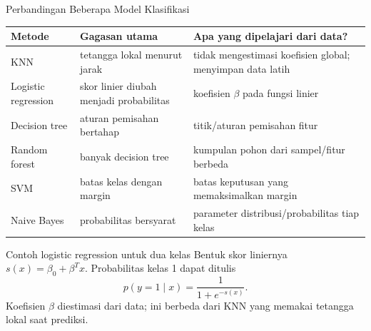 \documentclass[aspectratio=169,11pt]{beamer}
\begin{document}
\begin{frame}{Perbandingan Beberapa Model Klasifikasi}
\scriptsize
\begin{center}
\begin{tabular}{p{3.0cm} p{4.3cm} p{5.8cm}}
\toprule
Metode & Gagasan utama & Apa yang dipelajari dari data? \\
\midrule
KNN & tetangga lokal menurut jarak & tidak mengestimasi koefisien global; menyimpan data latih \\
Logistic regression & skor linier diubah menjadi probabilitas & koefisien $\beta$ pada fungsi linier \\
Decision tree & aturan pemisahan bertahap & titik/aturan pemisahan fitur \\
Random forest & banyak decision tree & kumpulan pohon dari sampel/fitur berbeda \\
SVM & batas kelas dengan margin & batas keputusan yang memaksimalkan margin \\
Naive Bayes & probabilitas bersyarat & parameter distribusi/probabilitas tiap kelas \\
\bottomrule
\end{tabular}
\end{center}
\vspace{1mm}
\begin{block}{Contoh logistic regression untuk dua kelas}
\footnotesize
Bentuk skor liniernya $s(x)=\beta_0+\beta^T x$. Probabilitas kelas 1 dapat ditulis
\[
p(y=1\mid x)=\frac{1}{1+e^{-s(x)}}.
\]
Koefisien $\beta$ diestimasi dari data; ini berbeda dari KNN yang memakai tetangga lokal saat prediksi.
\end{block}
\end{frame}
\end{document}
